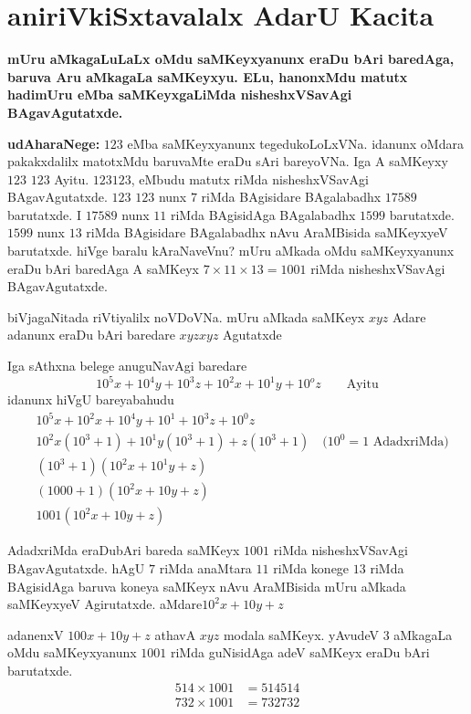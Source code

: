 \chapter{aniriVkiSxtavalalx AdarU Kacita}
\vskip -20pt

{\bf mUru aMkagaLuLaLx oMdu saMKeyxyanunx eraDu bAri baredAga, baruva Aru aMkagaLa saMKeyxyu. ELu, hanonxMdu matutx hadimUru eMba saMKeyxgaLiMda nisheshxVSavAgi BAgavAgutatxde.}

\textbf{udAharaNege:} $123$ eMba saMKeyxyanunx tegedukoLoLxVNa. idanunx oMdara pakakxdalilx matotxMdu baruvaMte eraDu sAri bareyoVNa. Iga A saMKeyxy $123$ $123$ Ayitu. $123123$, eMbudu {} matutx {} riMda nisheshxVSavAgi BAgavAgutatxde. $123$ $123$ nunx $7$ riMda BAgisidare BAgalabadhx $17589$ barutatxde. I $17589$ nunx $11$ riMda BAgisidAga BAgalabadhx $1599$ barutatxde. $1599$ nunx $13$ riMda BAgisidare BAgalabadhx nAvu AraMBisida saMKeyxyeV barutatxde. hiVge baralu kAraNaveVnu? mUru aMkada oMdu saMKeyxyanunx eraDu bAri baredAga A saMKeyx $7\times 11 \times 13 = 1001$ riMda nisheshxVSavAgi BAgavAgutatxde.

biVjagaNitada riVtiyalilx noVDoVNa. mUru aMkada saMKeyx $xyz$ Adare adanunx eraDu bAri baredare $xyzxyz$ Agutatxde

Iga sAthxna belege anuguNavAgi baredare
$$
10^5x+10^4y+10^3z+10^2x+10^1y+10^{o}z \qquad\text{Ayitu}
$$
idanunx hiVgU bareyabahudu
\begin{align*}
&10^{5}x+10^{2}x+10^{4}y+10^1+10^{3}z+10^{0}z\\
&10^{2}x\left(10^3+1\right) + 10^{1}y\left(10^3+1\right) + z\left(10^3 + 1\right) \quad\text{($10^0 = 1$ AdadxriMda)}\\
&\left(10^3+1\right)\left(10^{2}x + 10^1{y} + z\right)\\
&(1000+1)\left(10^{2}x+10y+z\right)\\
&1001\left(10^{2}x +10y +z\right)
\end{align*}

AdadxriMda eraDubAri bareda saMKeyx $1001$ riMda nisheshxVSavAgi BAgavAgutatxde. hAgU $7$ riMda anaMtara $11$ riMda konege $13$ riMda BAgisidAga baruva koneya saMKeyx nAvu AraMBisida mUru aMkada saMKeyxyeV Agirutatxde. aMdare\break $10^{2}x+10y+z$

adanenxV $100x+10y+z$ athavA $xyz$ modala saMKeyx. yAvudeV $3$ aMkagaLa oMdu saMKeyxyanunx $1001$ riMda guNisidAga adeV saMKeyx eraDu bAri barutatxde.
\begin{align*}
514\times 1001 &= 514514\\
732\times 1001 &= 732732
\end{align*}

